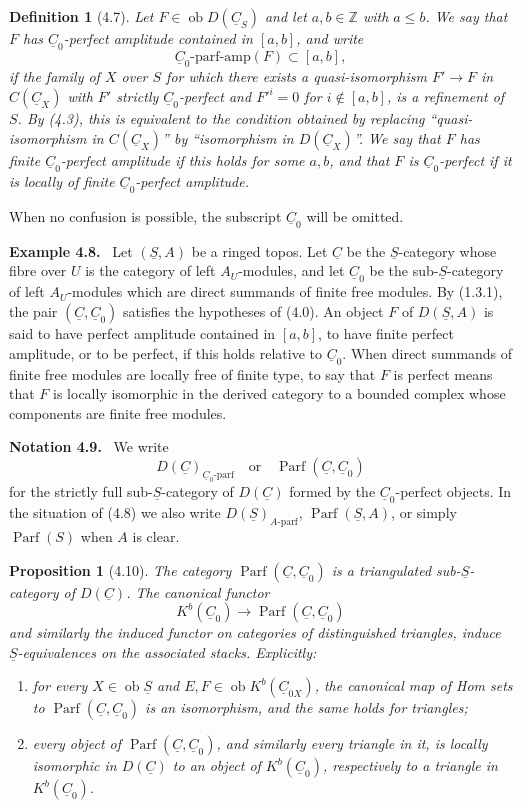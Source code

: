 \documentclass[13pt]{extarticle}
\newcommand{\ZZ}{\mathbb Z}
\newcommand{\uS}{\underline S}
\newcommand{\uC}{\underline C}
\newcommand{\ob}{\operatorname{ob}}
\newcommand{\Parf}{\operatorname{Parf}}
\newenvironment{statement}[1]{\par\medskip\noindent\textbf{#1.}\ }{\par\medskip}
\newtheorem*{proposition*}{Proposition}
\newtheorem*{definition*}{Definition}
\begin{document}
\begin{definition*}[4.7]
Let $F\in\ob D(\uC_S)$ and let $a,b\in\ZZ$ with $a\leq b$. We say that $F$ has \emph{$\uC_0$-perfect amplitude contained in $[a,b]$}, and write
\[
\uC_0\text{-parf-amp}(F)\subset[a,b],
\]
if the family of $X$ over $S$ for which there exists a quasi-isomorphism $F'\to F$ in $C(\uC_X)$ with $F'$ strictly $\uC_0$-perfect and $F'^i=0$ for $i\notin[a,b]$, is a refinement of $S$. By (4.3), this is equivalent to the condition obtained by replacing ``quasi-isomorphism in $C(\uC_X)$'' by ``isomorphism in $D(\uC_X)$''. We say that $F$ has finite $\uC_0$-perfect amplitude if this holds for some $a,b$, and that $F$ is $\uC_0$-perfect if it is locally of finite $\uC_0$-perfect amplitude.
\end{definition*}

When no confusion is possible, the subscript $\uC_0$ will be omitted.

\begin{statement}{Example 4.8}
Let $(\uS,A)$ be a ringed topos. Let $\uC$ be the $\uS$-category whose fibre over $U$ is the category of left $A_U$-modules, and let $\uC_0$ be the sub-$\uS$-category of left $A_U$-modules which are direct summands of finite free modules. By (1.3.1), the pair $(\uC,\uC_0)$ satisfies the hypotheses of (4.0). An object $F$ of $D(\uS,A)$ is said to have perfect amplitude contained in $[a,b]$, to have finite perfect amplitude, or to be perfect, if this holds relative to $\uC_0$. When direct summands of finite free modules are locally free of finite type, to say that $F$ is perfect means that $F$ is locally isomorphic in the derived category to a bounded complex whose components are finite free modules.
\end{statement}

\begin{statement}{Notation 4.9}
We write
\[
D(\uC)_{\uC_0\text{-parf}}\quad\text{or}\quad \Parf(\uC,\uC_0)
\]
for the strictly full sub-$\uS$-category of $D(\uC)$ formed by the $\uC_0$-perfect objects. In the situation of (4.8) we also write $D(\uS)_{A\text{-parf}}$, $\Parf(\uS,A)$, or simply $\Parf(S)$ when $A$ is clear.
\end{statement}

\begin{proposition*}[4.10]
The category $\Parf(\uC,\uC_0)$ is a triangulated sub-$\uS$-category of $D(\uC)$. The canonical functor
\[
K^b(\uC_0)\longrightarrow\Parf(\uC,\uC_0)
\]
and similarly the induced functor on categories of distinguished triangles, induce $\uS$-equivalences on the associated stacks. Explicitly:
\begin{enumerate}[label=(\roman*)]
\item for every $X\in\ob\uS$ and $E,F\in\ob K^b(\uC_{0X})$, the canonical map of Hom sets to $\Parf(\uC,\uC_0)$ is an isomorphism, and the same holds for triangles;
\item every object of $\Parf(\uC,\uC_0)$, and similarly every triangle in it, is locally isomorphic in $D(\uC)$ to an object of $K^b(\uC_0)$, respectively to a triangle in $K^b(\uC_0)$.
\end{enumerate}
\end{proposition*}
\end{document}
